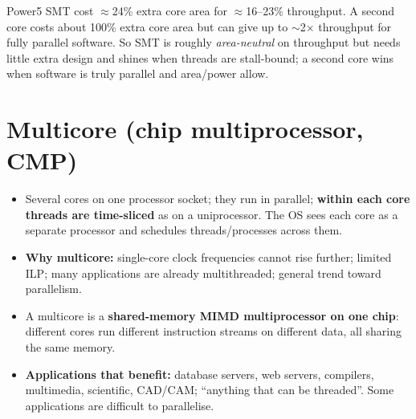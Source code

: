 \begin{ex}\bs
Power5 SMT cost $\approx$24\% extra core area for $\approx$16--23\% throughput. A second core costs about 100\% extra core area but can give up to $\sim$2$\times$ throughput for fully parallel software. So SMT is roughly \emph{area-neutral} on throughput but needs little extra design and shines when threads are stall-bound; a second core wins when software is truly parallel and area/power allow.
\end{ex}

\section{Multicore (chip multiprocessor, CMP)}
\begin{itemize}
\item Several cores on one processor socket; they run in parallel; \textbf{within each core threads are time-sliced} as on a uniprocessor. The OS sees each core as a separate processor and schedules threads/processes across them.
\item \textbf{Why multicore:} single-core clock frequencies cannot rise further; limited ILP; many applications are already multithreaded; general trend toward parallelism.
\item A multicore is a \textbf{shared-memory MIMD multiprocessor on one chip}: different cores run different instruction streams on different data, all sharing the same memory.
\item \textbf{Applications that benefit:} database servers, web servers, compilers, multimedia, scientific, CAD/CAM; ``anything that can be threaded''. Some applications are difficult to parallelise.
\end{itemize}

